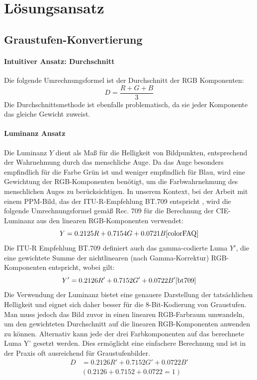 \documentclass[course=erap]{aspdoc}
\begin{document}
\section{Lösungsansatz}

\subsection{Graustufen-Konvertierung}
\paragraph{Intuitiver Ansatz: Durchschnitt}

Die folgende Umrechnungsformel ist der Durchschnitt der RGB Komponenten:
 \[ D = \frac{R + G + B}{3}  \]
Die Durchschnittsmethode ist ebenfalls problematisch, da sie jeder Komponente das gleiche Gewicht zuweist.

\paragraph{Luminanz Ansatz}

Die Luminanz $Y$ dient als Maß für die Helligkeit von Bildpunkten, entsprechend der Wahrnehmung durch das menschliche Auge. Da das Auge besonders empfindlich für die Farbe Grün ist und weniger empfindlich für Blau, wird eine Gewichtung der RGB-Komponenten benötigt, um die Farbwahrnehmung des menschlichen Auges zu berücksichtigen. \cite{colorFAQ}
In unserem Kontext, bei der Arbeit mit einem PPM-Bild, das der ITU-R-Empfehlung BT.709 entspricht \cite{netpbm}, wird die folgende Umrechnungsformel gemäß Rec. 709 für die Berechnung der CIE-Luminanz aus den linearen RGB-Komponenten verwendet:
 \[Y = 0.2125R + 0.7154G + 0.0721B \cite{colorFAQ} \] 
Die ITU-R Empfehlung BT.709 definiert auch das gamma-codierte Luma $Y'$, die eine gewichtete Summe der nichtlinearen (nach Gamma-Korrektur) RGB-Komponenten entspricht, wobei gilt:
 \[Y' = 0.2126R' + 0.7152G' + 0.0722B' \cite{bt709} \] 
Die Verwendung der Luminanz bietet eine genauere Darstellung der tatsächlichen Helligkeit und eignet sich daher besser für die 8-Bit-Kodierung von Graustufen. Man muss jedoch das Bild zuvor in einen linearen RGB-Farbraum umwandeln, um den gewichteten Durchschnitt auf die linearen RGB-Komponenten anwenden zu können.
Alternativ kann jede der drei Farbkomponenten auf das berechnete Luma Y' gesetzt werden. Dies ermöglicht eine einfachere Berechnung und ist in der Praxis oft ausreichend für Graustufenbilder.
\begin{align*} 
 D &= 0.2126R' + 0.7152G' + 0.0722B' \\
 &(0.2126 + 0.7152 + 0.0722 = 1)
\end{align*}
\end{document}
